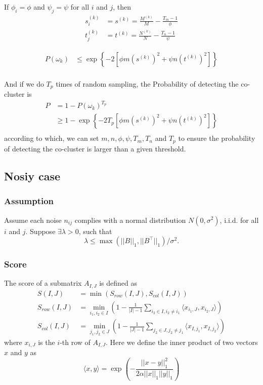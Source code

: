 If $\phi_i = \phi$ and $\psi_j = \psi$ for all $i$ and $j$, then
\begin{align*}
    s_i^{(k)} & = s^{(k)} = \frac{M^{(k)}}{M}-\frac{T_m-1}{\phi} \\
    t_j^{(k)} & = t^{(k)} = \frac{N^{(k)}}{N}-\frac{T_n-1}{\psi}
\end{align*}

\begin{align*}
    P(\omega_k) & \le \exp \left\{ -2 [\phi m (s^{(k)})^2 + \psi n (t^{(k)})^2] \right\} \\
\end{align*}


And if we do $T_p$ times of random sampling, the Probability of detecting the co-cluster is
\begin{align*}
    P & = 1 - P(\omega_k)^{T_p}                                                        \\
      & \ge 1 - \exp \left\{ -2 T_p [\phi m (s^{(k)})^2 + \psi n (t^{(k)})^2] \right\} \\
\end{align*}
according to which, we can set $m, n, \phi, \psi, T_m, T_n$ and $T_p$ to ensure the probability of detecting the co-cluster is larger than a given threshold.

\subsection{Nosiy case}
\subsubsection{Assumption}
Assume each noise $n_{ij}$ complies with a normal distribution $N(0, \sigma^2)$, i.i.d. for all $i$ and $j$. Suppose $\exists \lambda > 0$, such that
$$\lambda \le \max(||B||_1, ||B^\top||_1)/\sigma^2.$$

\subsubsection{Score}
The score of a submatrix $A_{I,J}$ is defined as
\begin{align}
    S(I,J)       & = \min(S_{row}(I,J), S_{col}(I,J))                                                                                          \\
    S_{row}(I,J) & = \min_{i_1, i_2 \in I} \left(1- \frac{1}{|I|-1} \sum_{i_2 \in I, i_2 \neq i_1} \langle x_{i_1,J}, x_{i_2,J}\rangle \right) \\
    S_{col}(I,J) & = \min_{j_1, j_2 \in J} \left(1- \frac{1}{|J|-1} \sum_{j_2 \in J, j_2 \neq j_1} \langle x_{I,j_1}, x_{I,j_2}\rangle \right)
\end{align}
where $x_{i,J}$ is the $i$-th row of $A_{I,J}$. Here we define the inner product of two vectors $x$ and $y$ as
$$\langle x, y \rangle = \exp(-\frac{||x - y||_1^2}{2\alpha||x||_1||y||_1})$$

